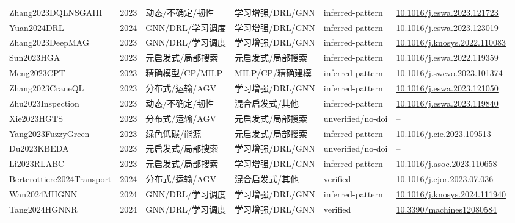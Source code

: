 \documentclass[UTF8,a4paper,11pt]{ctexart}
\begin{document}
\begin{landscape}
\begin{longtable}{>{\raggedright\arraybackslash}p{5.0cm}p{0.8cm}>{\raggedright\arraybackslash}p{2.6cm}>{\raggedright\arraybackslash}p{2.8cm}>{\raggedright\arraybackslash}p{2.6cm}>{\raggedright\arraybackslash}p{5.4cm}}
Zhang2023DQLNSGAIII & 2023 & 动态/不确定/韧性 & 学习增强/DRL/GNN & inferred-pattern & \href{https://doi.org/10.1016/j.eswa.2023.121723}{10.1016/j.eswa.2023.121723} \\
Yuan2024DRL & 2024 & GNN/DRL/学习调度 & 学习增强/DRL/GNN & inferred-pattern & \href{https://doi.org/10.1016/j.eswa.2023.123019}{10.1016/j.eswa.2023.123019} \\
Zhang2023DeepMAG & 2023 & GNN/DRL/学习调度 & 学习增强/DRL/GNN & inferred-pattern & \href{https://doi.org/10.1016/j.knosys.2022.110083}{10.1016/j.knosys.2022.110083} \\
Sun2023HGA & 2023 & 元启发式/局部搜索 & 元启发式/局部搜索 & inferred-pattern & \href{https://doi.org/10.1016/j.eswa.2022.119359}{10.1016/j.eswa.2022.119359} \\
Meng2023CPT & 2023 & 精确模型/CP/MILP & MILP/CP/精确建模 & inferred-pattern & \href{https://doi.org/10.1016/j.swevo.2023.101374}{10.1016/j.swevo.2023.101374} \\
Zhang2023CraneQL & 2023 & 分布式/运输/AGV & 学习增强/DRL/GNN & inferred-pattern & \href{https://doi.org/10.1016/j.eswa.2023.121050}{10.1016/j.eswa.2023.121050} \\
Zhu2023Inspection & 2023 & 动态/不确定/韧性 & 混合启发式/其他 & inferred-pattern & \href{https://doi.org/10.1016/j.eswa.2023.119840}{10.1016/j.eswa.2023.119840} \\
Xie2023HGTS & 2023 & 分布式/运输/AGV & 元启发式/局部搜索 & unverified/no-doi & -- \\
Yang2023FuzzyGreen & 2023 & 绿色低碳/能源 & 元启发式/局部搜索 & inferred-pattern & \href{https://doi.org/10.1016/j.cie.2023.109513}{10.1016/j.cie.2023.109513} \\
Du2023KBEDA & 2023 & 元启发式/局部搜索 & 学习增强/DRL/GNN & unverified/no-doi & -- \\
Li2023RLABC & 2023 & 元启发式/局部搜索 & 学习增强/DRL/GNN & inferred-pattern & \href{https://doi.org/10.1016/j.asoc.2023.110658}{10.1016/j.asoc.2023.110658} \\
Berterottiere2024Transport & 2024 & 分布式/运输/AGV & 混合启发式/其他 & verified & \href{https://doi.org/10.1016/j.ejor.2023.07.036}{10.1016/j.ejor.2023.07.036} \\
Wan2024MHGNN & 2024 & GNN/DRL/学习调度 & 学习增强/DRL/GNN & inferred-pattern & \href{https://doi.org/10.1016/j.knosys.2024.111940}{10.1016/j.knosys.2024.111940} \\
Tang2024HGNNR & 2024 & GNN/DRL/学习调度 & 学习增强/DRL/GNN & verified & \href{https://doi.org/10.3390/machines12080584}{10.3390/machines12080584} \\

\end{longtable}
\end{landscape}
\end{document}
